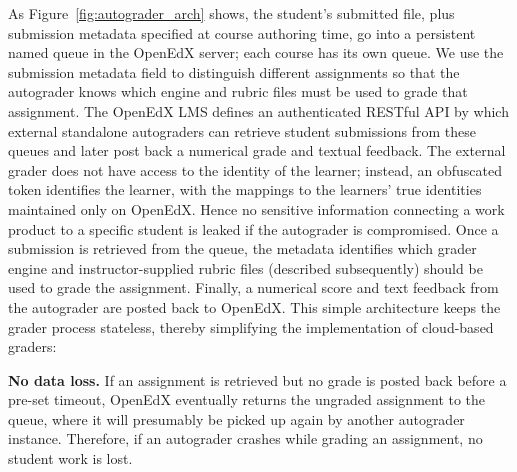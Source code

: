 As Figure~\ref{fig:autograder_arch} shows, 
the student's submitted file, plus
submission metadata specified at course authoring time, go into a
persistent named queue in the OpenEdX server; each course has its own queue.
We use the submission metadata field to distinguish different
assignments so that the autograder knows which engine and rubric files
must be used to grade that assignment.
The OpenEdX LMS defines an authenticated RESTful
API
by which external standalone autograders can retrieve student
submissions from these queues and later post back a numerical grade and
textual feedback.
The external grader does not have access to the identity of the learner;
instead, an obfuscated token identifies the learner, with the mappings
to the learners' true identities maintained only on OpenEdX.
Hence no sensitive information connecting a work product to a specific
student is leaked if the autograder is compromised.
Once a submission is retrieved from the queue, the metadata identifies
which grader engine and instructor-supplied rubric files (described
subsequently) should be 
used to grade the assignment.  Finally, a numerical score and 
text feedback from the autograder 
are posted back to OpenEdX.
This simple architecture keeps the grader process stateless, thereby 
simplifying the implementation of cloud-based graders:

\textbf{No data loss.}
If an assignment is retrieved but no grade is posted back before
a pre-set timeout, OpenEdX eventually returns the ungraded assignment to
the queue, where it will presumably be picked up again by another
autograder instance.
Therefore, if an autograder crashes while grading an assignment, no
student work is lost.

